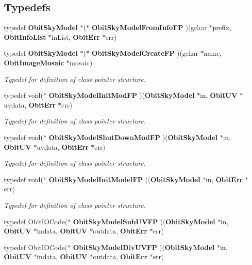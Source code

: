 \subsection*{Typedefs}
\begin{CompactItemize}
\item 
typedef {\bf Obit\-Sky\-Model} $\ast$($\ast$ {\bf Obit\-Sky\-Model\-From\-Info\-FP} )(gchar $\ast$prefix, {\bf Obit\-Info\-List} $\ast$in\-List, {\bf Obit\-Err} $\ast$err)
\item 
typedef {\bf Obit\-Sky\-Model} $\ast$($\ast$ {\bf Obit\-Sky\-Model\-Create\-FP} )(gchar $\ast$name, {\bf Obit\-Image\-Mosaic} $\ast$mosaic)
\begin{CompactList}\small\item\em Typedef for definition of class pointer structure. \item\end{CompactList}\item 
typedef void($\ast$ {\bf Obit\-Sky\-Model\-Init\-Mod\-FP} )({\bf Obit\-Sky\-Model} $\ast$in, {\bf Obit\-UV} $\ast$uvdata, {\bf Obit\-Err} $\ast$err)
\begin{CompactList}\small\item\em Typedef for definition of class pointer structure. \item\end{CompactList}\item 
typedef void($\ast$ {\bf Obit\-Sky\-Model\-Shut\-Down\-Mod\-FP} )({\bf Obit\-Sky\-Model} $\ast$in, {\bf Obit\-UV} $\ast$uvdata, {\bf Obit\-Err} $\ast$err)
\begin{CompactList}\small\item\em Typedef for definition of class pointer structure. \item\end{CompactList}\item 
typedef void($\ast$ {\bf Obit\-Sky\-Model\-Init\-Model\-FP} )({\bf Obit\-Sky\-Model} $\ast$in, {\bf Obit\-Err} $\ast$err)
\begin{CompactList}\small\item\em Typedef for definition of class pointer structure. \item\end{CompactList}\item 
typedef Obit\-IOCode($\ast$ {\bf Obit\-Sky\-Model\-Sub\-UVFP} )({\bf Obit\-Sky\-Model} $\ast$in, {\bf Obit\-UV} $\ast$indata, {\bf Obit\-UV} $\ast$outdata, {\bf Obit\-Err} $\ast$err)
\item 
typedef Obit\-IOCode($\ast$ {\bf Obit\-Sky\-Model\-Div\-UVFP} )({\bf Obit\-Sky\-Model} $\ast$in, {\bf Obit\-UV} $\ast$indata, {\bf Obit\-UV} $\ast$outdata, {\bf Obit\-Err} $\ast$err)

\end{CompactItemize}
